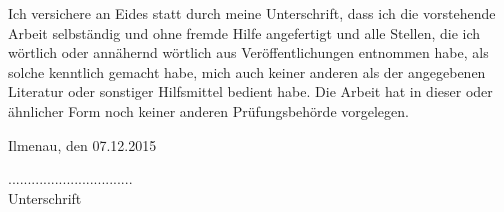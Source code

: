 \documentclass[a4paper,oneside,12pt]{scrreprt}
\begin{document}
\begin{normalsize}
Ich versichere an Eides statt durch meine Unterschrift, dass ich die vorstehende Arbeit selbständig und ohne fremde Hilfe angefertigt und alle Stellen, die ich wörtlich oder annähernd wörtlich aus Veröffentlichungen entnommen habe, als solche kenntlich gemacht habe, mich auch keiner anderen als der angegebenen Literatur oder sonstiger Hilfsmittel bedient habe. Die Arbeit hat in dieser oder ähnlicher Form noch keiner anderen Prüfungsbehörde vorgelegen.
\vspace*{1cm}

Ilmenau, den 07.12.2015
\vspace*{1cm}
\begin{flushleft}
\begin{minipage}[t]{6cm}
................................\\
Unterschrift
\end{minipage}
\end{flushleft}


\end{normalsize}
\end{document}
